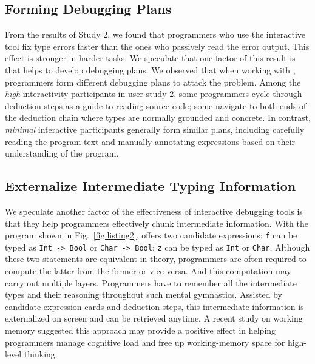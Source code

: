 \subsection{Forming Debugging Plans}
From the results of Study 2, we found that programmers who use the interactive tool fix type errors faster than the ones who passively read the error output. This effect is stronger in harder tasks. We speculate that one factor of this result is that  \chameleon{} helps to develop debugging plans. We observed that when working with \chameleon{}, programmers form different debugging plans to attack the problem. Among the \textit{high} interactivity participants in user study 2, some programmers cycle through deduction steps as a guide to reading source code; some navigate to both ends of the deduction chain where types are normally grounded and concrete. In contrast, \textit{minimal} interactive participants generally form similar plans, including carefully reading the program text and manually annotating expressions based on their understanding of the program.


\subsection{Externalize Intermediate Typing Information}
We speculate another factor of the effectiveness of \chameleon{} interactive debugging tools is that they help programmers effectively chunk intermediate information. With the program shown in Fig.~\ref{fig:listing2}, \chameleon{} offers two candidate expressions: \texttt{f} can be typed as \texttt{Int -> Bool} or \texttt{Char -> Bool}; \texttt{z} can be typed as \texttt{Int} or \texttt{Char}. Although  these two statements are equivalent in theory, programmers are often required to compute the latter from the former or vice versa. And this computation may carry out multiple layers. Programmers have to remember all the intermediate types and their reasoning throughout such mental gymnastics. Assisted by candidate expression cards and deduction steps, this intermediate information is externalized on screen and can be retrieved anytime. A recent study on working memory \cite{Crichton2021-ru} suggested this approach may provide a positive effect in helping programmers manage cognitive load and free up working-memory space for high-level thinking.



